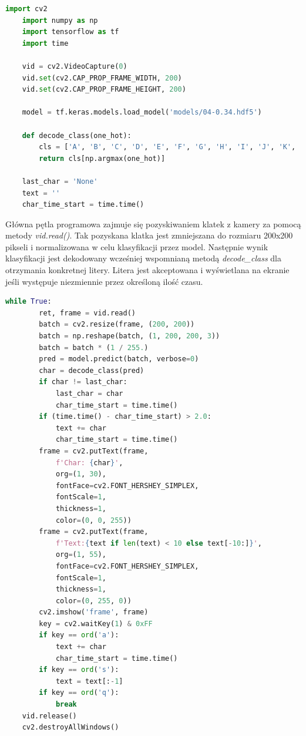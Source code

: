 \documentclass[a4paper,12pt,oneside]{book} %
\begin{document}
\begin{lstlisting}[language=Python, caption={Wykorzystywane biblioteki i inicjalizacja zmiennych}, label={lst:appimports}]
	import cv2
	import numpy as np
	import tensorflow as tf
	import time
	
	vid = cv2.VideoCapture(0)
	vid.set(cv2.CAP_PROP_FRAME_WIDTH, 200)
	vid.set(cv2.CAP_PROP_FRAME_HEIGHT, 200)

	model = tf.keras.models.load_model('models/04-0.34.hdf5')
	
	def decode_class(one_hot):
		cls = ['A', 'B', 'C', 'D', 'E', 'F', 'G', 'H', 'I', 'J', 'K', 'L', 'M', 'N', 'O', 'P', 'Q', 'R', 'S', 'T', 'U', 'V', 'W', 'X', 'Y', 'Z']
		return cls[np.argmax(one_hot)]
	
	last_char = 'None'
	text = ''
	char_time_start = time.time()
\end{lstlisting}

Główna pętla programowa zajmuje się pozyskiwaniem klatek z kamery za pomocą metody \emph{vid.read()}. Tak pozyskana klatka jest zmniejszana do rozmiaru 200x200 pikseli i normalizowana w celu klasyfikacji przez model. Następnie wynik klasyfikacji jest dekodowany wcześniej wspomnianą metodą \emph{decode\_class} dla otrzymania konkretnej litery. Litera jest akceptowana i wyświetlana na ekranie jeśli występuje niezmiennie przez określoną ilość czasu.

\begin{lstlisting}[language=Python, caption={Pętla programowa}, label={lst:apploop}]
	while True:
		ret, frame = vid.read()
		batch = cv2.resize(frame, (200, 200))
		batch = np.reshape(batch, (1, 200, 200, 3))
		batch = batch * (1 / 255.)
		pred = model.predict(batch, verbose=0)
		char = decode_class(pred)
		if char != last_char:
			last_char = char
			char_time_start = time.time()
		if (time.time() - char_time_start) > 2.0:
			text += char
			char_time_start = time.time()
		frame = cv2.putText(frame,
			f'Char: {char}',
			org=(1, 30),
			fontFace=cv2.FONT_HERSHEY_SIMPLEX,
			fontScale=1,
			thickness=1,
			color=(0, 0, 255))
		frame = cv2.putText(frame,
			f'Text:{text if len(text) < 10 else text[-10:]}',
			org=(1, 55),
			fontFace=cv2.FONT_HERSHEY_SIMPLEX,
			fontScale=1,
			thickness=1,
			color=(0, 255, 0))
		cv2.imshow('frame', frame)
		key = cv2.waitKey(1) & 0xFF
		if key == ord('a'):
			text += char
			char_time_start = time.time()
		if key == ord('s'):
			text = text[:-1]
		if key == ord('q'):
			break
	vid.release()
	cv2.destroyAllWindows()
\end{lstlisting}
\end{document}
